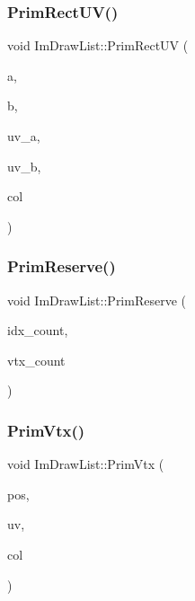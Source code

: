 \subsubsection{\texorpdfstring{Prim\+Rect\+U\+V()}{PrimRectUV()}}
{\footnotesize\ttfamily void Im\+Draw\+List\+::\+Prim\+Rect\+UV (\begin{DoxyParamCaption}\item[{const \hyperlink{struct_im_vec2}{Im\+Vec2} \&}]{a,  }\item[{const \hyperlink{struct_im_vec2}{Im\+Vec2} \&}]{b,  }\item[{const \hyperlink{struct_im_vec2}{Im\+Vec2} \&}]{uv\+\_\+a,  }\item[{const \hyperlink{struct_im_vec2}{Im\+Vec2} \&}]{uv\+\_\+b,  }\item[{Im\+U32}]{col }\end{DoxyParamCaption})}

\hypertarget{struct_im_draw_list_a879aa38dbfb0344e3e023d65c002c7d7}{}\label{struct_im_draw_list_a879aa38dbfb0344e3e023d65c002c7d7} 
\subsubsection{\texorpdfstring{Prim\+Reserve()}{PrimReserve()}}
{\footnotesize\ttfamily void Im\+Draw\+List\+::\+Prim\+Reserve (\begin{DoxyParamCaption}\item[{int}]{idx\+\_\+count,  }\item[{int}]{vtx\+\_\+count }\end{DoxyParamCaption})}

\hypertarget{struct_im_draw_list_a405377158f0028ad8b4fb6509eef4532}{}\label{struct_im_draw_list_a405377158f0028ad8b4fb6509eef4532} 
\subsubsection{\texorpdfstring{Prim\+Vtx()}{PrimVtx()}}
{\footnotesize\ttfamily void Im\+Draw\+List\+::\+Prim\+Vtx (\begin{DoxyParamCaption}\item[{const \hyperlink{struct_im_vec2}{Im\+Vec2} \&}]{pos,  }\item[{const \hyperlink{struct_im_vec2}{Im\+Vec2} \&}]{uv,  }\item[{Im\+U32}]{col }\end{DoxyParamCaption})}


